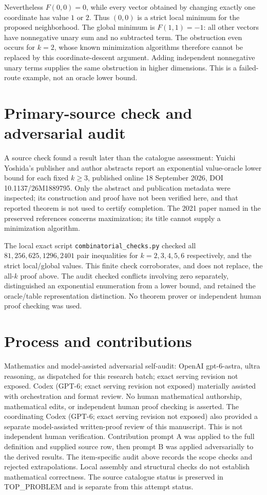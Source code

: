 \documentclass[11pt]{article}
\begin{document}
Nevertheless $F(0,0)=0$, while every vector obtained by changing exactly
one coordinate has value $1$ or $2$. Thus $(0,0)$ is a strict local minimum
for the proposed neighborhood. The global minimum is $F(1,1)=-1$:
all other vectors have nonnegative unary sum and no subtracted term.
The obstruction even occurs for $k=2$, whose known minimization algorithms
therefore cannot be replaced by this coordinate-descent argument.
Adding independent nonnegative unary terms supplies the same obstruction in
higher dimensions. This is a failed-route example, not an oracle lower bound.

\section{Primary-source check and adversarial audit}
A source check found a result later than the catalogue assessment:
Yuichi Yoshida's publisher and author abstracts report an exponential
value-oracle lower bound for each fixed $k\ge3$, published online
18 September 2026, DOI 10.1137/26M1889795. Only the abstract and publication
metadata were inspected; its construction and proof have not been verified
here, and that reported theorem is not used to certify completion.
The 2021 paper named in the preserved references concerns maximization;
its title cannot supply a minimization algorithm.

The local exact script \texttt{combinatorial\_checks.py} checked all
$81,256,625,1296,2401$ pair inequalities for $k=2,3,4,5,6$ respectively,
and the strict local/global values. This finite check corroborates, and does
not replace, the all-$k$ proof above. The audit checked conflicts involving
zero separately, distinguished an exponential enumeration from a lower bound,
and retained the oracle/table representation distinction. No theorem prover
or independent human proof checking was used.

\section{Process and contributions}
Mathematics and model-assisted adversarial self-audit: OpenAI gpt-6-astra, ultra reasoning, as dispatched for this research batch; exact serving revision not exposed. Codex (GPT-6; exact serving revision not exposed) materially assisted with orchestration and format review. No human mathematical authorship, mathematical edits, or independent human proof checking is asserted.
The coordinating Codex (GPT-6; exact serving revision not exposed) also provided a separate model-assisted written-proof review of this manuscript. This is not independent human verification.
Contribution prompt A was applied to the full definition and supplied source row, then prompt B was applied adversarially to the derived results. The item-specific audit above records the scope checks and rejected extrapolations. Local assembly and structural checks do not establish mathematical correctness. The source catalogue status is preserved in TOP\_PROBLEM and is separate from this attempt status.
\end{document}

